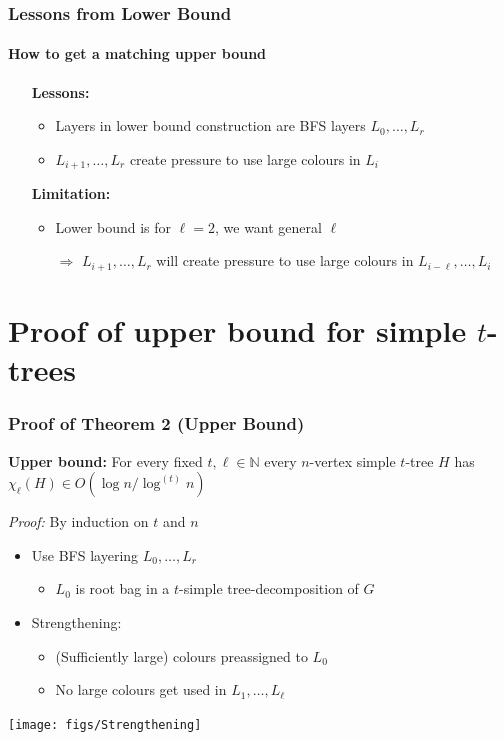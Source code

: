 \documentclass[xcolor=dvipsnames]{beamer}
\newcommand{\N}{\mathbb{N}}
\begin{document}
\begin{frame}
  \frametitle{Lessons from Lower Bound}
  \framesubtitle{How to get a matching upper bound}

  \begin{itemize}[<+->]
    \item[]\textbf{Lessons:}
    \begin{itemize}
      \item Layers in lower bound construction are BFS layers $L_0,\ldots,L_r$
      \item $L_{i+1},\ldots,L_r$ create pressure to use large colours in $L_i$
    \end{itemize}
    \vspace{1cm}
    \item[]\textbf{Limitation:}
    \begin{itemize}
      \item Lower bound is for $\ell=2$, we want general $\ell$
      \item[$\Rightarrow$] $L_{i+1},\ldots,L_r$ will create pressure to use large colours in $L_{i-\ell},\ldots,L_i$
    \end{itemize}
  \end{itemize}
\end{frame}

\section{Proof of upper bound for simple $t$-trees}

\begin{frame}
  \frametitle{Proof of Theorem 2 (Upper Bound)}

  \textbf{Upper bound:} For every fixed $t,\ell\in\N$ every $n$-vertex simple $t$-tree $H$ has $\chi_\ell(H)\in O(\log n/\log^{(t)} n)$

  \textit{Proof:} By induction on $t$ and $n$
  \begin{itemize}
    \item Use BFS layering $L_0,\ldots,L_r$
    \begin{itemize}
      \item $L_0$ is root bag in a $t$-simple tree-decomposition of $G$
    \end{itemize}
    \item Strengthening:
    \begin{itemize}
      \item (Sufficiently large) colours preassigned to $L_0$
      \item No large colours get used in $L_1,\ldots,L_{\ell}$
    \end{itemize}
  \end{itemize}
  \begin{center}
    \texttt{[image: figs/Strengthening]}
  \end{center}
\end{frame}
\end{document}
